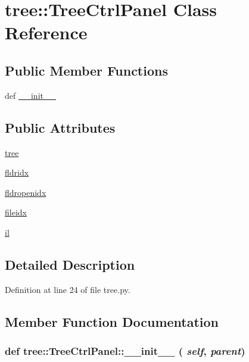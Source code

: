 \hypertarget{classtree_1_1TreeCtrlPanel}{
\section{tree::TreeCtrlPanel Class Reference}
\label{classtree_1_1TreeCtrlPanel}
}
\subsection*{Public Member Functions}
\begin{DoxyCompactItemize}
\item 
def \hyperlink{classtree_1_1TreeCtrlPanel_a1d9e35a0edda4b24604581cdf3627b66}{\_\-\_\-init\_\-\_\-}
\end{DoxyCompactItemize}
\subsection*{Public Attributes}
\begin{DoxyCompactItemize}
\item 
\hyperlink{classtree_1_1TreeCtrlPanel_ac9e9de14a996c897c125b174776f2fde}{tree}
\item 
\hyperlink{classtree_1_1TreeCtrlPanel_a89e5d0baeae1166731c338238dc1a685}{fldridx}
\item 
\hyperlink{classtree_1_1TreeCtrlPanel_aef4dd2f2fa6f44f114b8d26fab6003af}{fldropenidx}
\item 
\hyperlink{classtree_1_1TreeCtrlPanel_a070915afc92d6dc99cf4c05b584d23ff}{fileidx}
\item 
\hyperlink{classtree_1_1TreeCtrlPanel_a25c91bdac8149c9767062a4fb0c0d563}{il}
\end{DoxyCompactItemize}


\subsection{Detailed Description}


Definition at line 24 of file tree.py.

\subsection{Member Function Documentation}
\hypertarget{classtree_1_1TreeCtrlPanel_a1d9e35a0edda4b24604581cdf3627b66}{
\subsubsection[{\_\-\_\-init\_\-\_\-}]{\setlength{\rightskip}{0pt plus 5cm}def tree::TreeCtrlPanel::\_\-\_\-init\_\-\_\- ( {\em self}, \/   {\em parent})}}
\label{classtree_1_1TreeCtrlPanel_a1d9e35a0edda4b24604581cdf3627b66}


